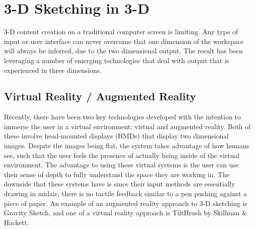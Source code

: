 \documentclass[12pt]{report}
\begin{document}
\section{3-D Sketching in 3-D}

3-D content creation on a traditional computer screen is limiting. 
Any type of input or user interface can never overcome that one dimension of the workspace will always be inferred, due to the two dimensional output.
The result has been leveraging a number of emerging technologies that deal with output that is experienced in three dimensions. 


\subsection{Virtual Reality / Augmented Reality}

Recently, there have been two key technologies developed with the intention to immerse the user in a virtual environment; virtual and augmented reality. 
Both of these involve head-mounted displays (HMDs) that display two dimensional images.
Despite the images being flat, the system takes advantage of how humans see, such that the user feels the presence of actually being inside of the virtual environment.
The advantage to using these virtual systems is the user can use their sense of depth to fully understand the space they are working in.
The downside that these systems have is since their input methods are essentially drawing in midair, there is no tactile feedback similar to a pen pushing against a piece of paper.
An example of an augmented reality approach to 3-D sketching is Gravity Sketch, and one of a virtual reality approach is TiltBrush  by Skillman \& Hackett.
\end{document}
